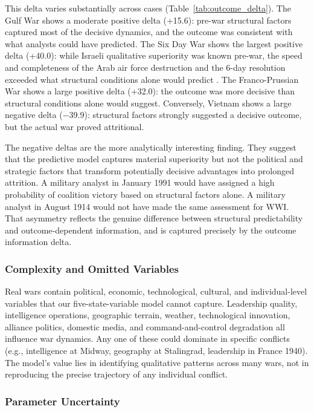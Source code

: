 This delta varies substantially across cases (Table~\ref{tab:outcome_delta}). The Gulf War shows a moderate positive delta (+15.6): pre-war structural factors captured most of the decisive dynamics, and the outcome was consistent with what analysts could have predicted. The Six Day War shows the largest positive delta (+40.0): while Israeli qualitative superiority was known pre-war, the speed and completeness of the Arab air force destruction and the 6-day resolution exceeded what structural conditions alone would predict \citep{oren2002}. The Franco-Prussian War shows a large positive delta (+32.0): the outcome was more decisive than structural conditions alone would suggest. Conversely, Vietnam shows a large negative delta ($-$39.9): structural factors strongly suggested a decisive outcome, but the actual war proved attritional.

The negative deltas are the more analytically interesting finding. They suggest that the predictive model captures material superiority but not the political and strategic factors that transform potentially decisive advantages into prolonged attrition. A military analyst in January 1991 would have assigned a high probability of coalition victory based on structural factors alone. A military analyst in August 1914 would not have made the same assessment for WWI. That asymmetry reflects the genuine difference between structural predictability and outcome-dependent information, and is captured precisely by the outcome information delta.

\subsubsection{Complexity and Omitted Variables}

Real wars contain political, economic, technological, cultural, and individual-level variables that our five-state-variable model cannot capture. Leadership quality, intelligence operations, geographic terrain, weather, technological innovation, alliance politics, domestic media, and command-and-control degradation all influence war dynamics. Any one of these could dominate in specific conflicts (e.g., intelligence at Midway, geography at Stalingrad, leadership in France 1940). The model's value lies in identifying qualitative patterns across many wars, not in reproducing the precise trajectory of any individual conflict.

\subsubsection{Parameter Uncertainty}

